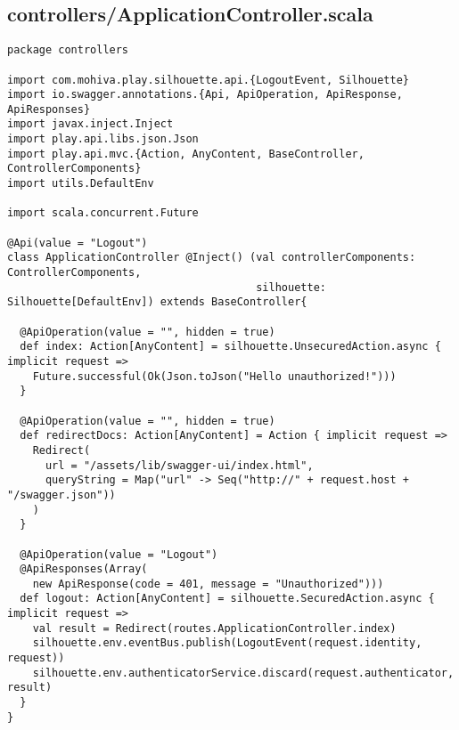 \subsection{controllers/ApplicationController.scala}
\begin{lstlisting}
package controllers

import com.mohiva.play.silhouette.api.{LogoutEvent, Silhouette}
import io.swagger.annotations.{Api, ApiOperation, ApiResponse, ApiResponses}
import javax.inject.Inject
import play.api.libs.json.Json
import play.api.mvc.{Action, AnyContent, BaseController, ControllerComponents}
import utils.DefaultEnv

import scala.concurrent.Future

@Api(value = "Logout")
class ApplicationController @Inject() (val controllerComponents: ControllerComponents,
                                       silhouette: Silhouette[DefaultEnv]) extends BaseController{

  @ApiOperation(value = "", hidden = true)
  def index: Action[AnyContent] = silhouette.UnsecuredAction.async { implicit request =>
    Future.successful(Ok(Json.toJson("Hello unauthorized!")))
  }

  @ApiOperation(value = "", hidden = true)
  def redirectDocs: Action[AnyContent] = Action { implicit request =>
    Redirect(
      url = "/assets/lib/swagger-ui/index.html",
      queryString = Map("url" -> Seq("http://" + request.host + "/swagger.json"))
    )
  }

  @ApiOperation(value = "Logout")
  @ApiResponses(Array(
    new ApiResponse(code = 401, message = "Unauthorized")))
  def logout: Action[AnyContent] = silhouette.SecuredAction.async { implicit request =>
    val result = Redirect(routes.ApplicationController.index)
    silhouette.env.eventBus.publish(LogoutEvent(request.identity, request))
    silhouette.env.authenticatorService.discard(request.authenticator, result)
  }
}
\end{lstlisting}
